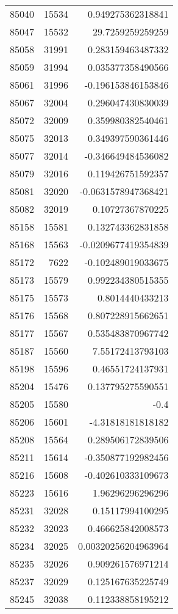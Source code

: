 \begin{tabular}{r | r | r}
85040 & 15534 & 0.949275362318841 \\
85047 & 15532 & 29.7259259259259 \\
85058 & 31991 & 0.283159463487332 \\
85059 & 31994 & 0.035377358490566 \\
85061 & 31996 & -0.196153846153846 \\
85067 & 32004 & 0.296047430830039 \\
85072 & 32009 & 0.359980382540461 \\
85075 & 32013 & 0.349397590361446 \\
85077 & 32014 & -0.346649484536082 \\
85079 & 32016 & 0.119426751592357 \\
85081 & 32020 & -0.0631578947368421 \\
85082 & 32019 & 0.10727367870225 \\
85158 & 15581 & 0.132743362831858 \\
85168 & 15563 & -0.0209677419354839 \\
85172 & 7622 & -0.102489019033675 \\
85173 & 15579 & 0.992234380515355 \\
85175 & 15573 & 0.8014440433213 \\
85176 & 15568 & 0.807228915662651 \\
85177 & 15567 & 0.535483870967742 \\
85187 & 15560 & 7.55172413793103 \\
85198 & 15596 & 0.46551724137931 \\
85204 & 15476 & 0.137795275590551 \\
85205 & 15580 & -0.4 \\
85206 & 15601 & -4.31818181818182 \\
85208 & 15564 & 0.289506172839506 \\
85211 & 15614 & -0.350877192982456 \\
85216 & 15608 & -0.402610333109673 \\
85223 & 15616 & 1.96296296296296 \\
85231 & 32028 & 0.15117994100295 \\
85232 & 32023 & 0.466625842008573 \\
85234 & 32025 & 0.00320256204963964 \\
85235 & 32026 & 0.909261576971214 \\
85237 & 32029 & 0.125167635225749 \\
85245 & 32038 & 0.112338858195212 \\

\end{tabular}
